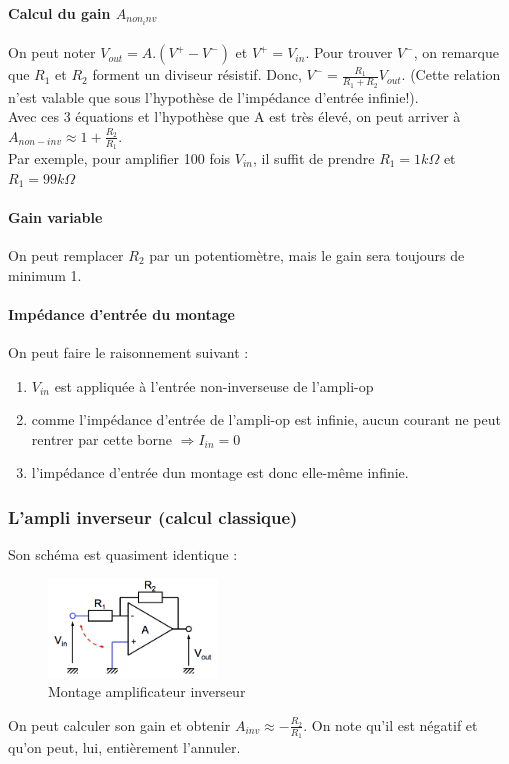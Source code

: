 \documentclass[a4paper]{article}
\begin{document}
    \paragraph{Calcul du gain $A_{non_inv}$}
    On peut noter $V_{out} = A.(V^+-V^-)$ et $V^+ = V_{in}$. Pour trouver $V^-$, 
    on remarque que $R_1$ et $R_2$ forment un diviseur résistif. Donc, 
    $V^- = \frac{R_1}{R_1+R_2}V_{out}$. (Cette relation n'est valable que
    sous l'hypothèse de l'impédance d'entrée infinie!).\\

    Avec ces 3 équations et l'hypothèse que A est très élevé, on peut arriver 
    à $A_{non-inv} \approx 1 + \frac{R_2}{R_1}$.\\

    Par exemple, pour amplifier 100 fois $V_{in}$, il suffit de prendre $R_1 = 1k\Omega$
    et $R_1 = 99k\Omega$

    \paragraph{Gain variable}
    On peut remplacer $R_2$ par un potentiomètre, mais le gain sera toujours de
    minimum 1.

    \paragraph{Impédance d'entrée du montage}
    On peut faire le raisonnement suivant :
    \begin{enumerate}
        \item $V_{in}$ est appliquée à l'entrée non-inverseuse de l'ampli-op
        \item comme l'impédance d'entrée de l'ampli-op est infinie, aucun courant
        ne peut rentrer par cette borne $\Rightarrow I_{in} = 0$
        \item l'impédance d'entrée dun montage est donc elle-même infinie.
    \end{enumerate}


    \subsubsection{L'ampli inverseur (calcul classique)}
    Son schéma est quasiment identique :
    \begin{figure}[H]
        \begin{center}
            \includegraphics[width=0.4\textwidth]{fig/4_montampi.png}
            \caption{Montage amplificateur inverseur}
            \label{fig:4_montampi}
        \end{center}
    \end{figure}
    On peut calculer son gain et obtenir $A_{inv} \approx - \frac{R_2}{R_1}$. On 
    note qu'il est négatif et qu'on peut, lui, entièrement l'annuler.
\end{document}
